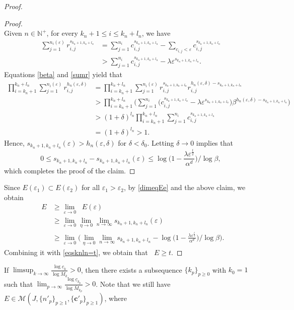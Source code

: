 \documentclass[12pt]{amsart}
\numberwithin{equation}{section}
\theoremstyle{plain}
\theoremstyle{remark}
\theoremstyle{definition}
\newcommand{\om}{\overline{M}}
\newcommand{\N}{\mathbb{N}}
\newcommand{\ccc}{\mathbf{c}}
\newcommand{\eps}{\varepsilon}
\newcommand{\de}{\delta}
\newcommand{\f}{\frac}
\newcommand{\uc}{\underline{c}}
\newcommand{\lam}{\lambda}
\renewcommand{\ge}{\geqslant}
\renewcommand{\le}{\leqslant}
\DeclareMathOperator{\dimqa}{dim_{qA}}
\begin{document}
\begin{proof}
\begin{proof}
\begin{equation}
			\end{equation}
			Given  $n\in \N^+$,  for every $ k_n+1\le i\le k_n+l_n$, we have
			\begin{equation}\label{sumr}
				\begin{aligned}
					\sum_{j=1}^{n_i(\eps)}r_{i,j}^{s_{k_n+1,k_n+l_n}}&=\sum_{j=1}^{n_i}c_{i,j}^{s_{k_n+1,k_n+l_n}}-\sum_{c_{i,j}<\eps}c_{i,j}^{s_{k_n+1,k_n+l_n}}\\
					&>\sum_{j=1}^{n_i}c_{i,j}^{s_{k_n+1,k_n+l_n}}-\lambda \eps^{s_{k_n+1,k_n+l_n}}.
				\end{aligned}
			\end{equation}
			Equations \eqref{beta} and \eqref{sumr} yield that
			\begin{align*}
				\prod_{i=k_n+1}^{k_n+l_n}\sum_{j=1}^{n_i(\eps)}r_{i,j}^{h_n(\eps,\de)}&=\prod_{i=k_n+1}^{k_n+l_n}\sum_{j=1}^{n_i(\eps)}r_{i,j}^{s_{k_n+1,k_n+l_n}}r_{i,j}^{h_n(\eps,\de)-s_{k_n+1,k_n+l_n}}\\
				&>\prod_{i=k_n+1}^{k_n+l_n}\Big(\sum_{j=1}^{n_i}\Big(c_{i,j}^{s_{k_n+1,k_n+l_n}}-\lambda \eps^{s_{k_n+1,k_n+l_n}}\Big)\beta^{h_n(\eps,\de)-s_{k_n+1,k_n+l_n}}\Big)\\
				&>(1+\de)^{l_n}\prod_{i=k_n+1}^{k_n+l_n}\sum_{j=1}^{n_i}c_{i,j}^{s_{k_n+1,k_n+l_n}}\\
				&=(1+\de)^{l_n} >1.
			\end{align*}
			Hence, $s_{k_n+1,k_n+l_n}(\eps)>h_n(\eps,\de)$ for $\de<\de_0$. 
			Letting $\de\to0$ implies that
			\[
			0\le s_{k_n+1,k_n+l_n}-s_{k_n+1,k_n+l_n}(\eps)\le{\log\Big(1-\frac{\lam \eps^{\frac{t}2}}{\alpha^d}\Big)}\Big/{\log \beta},
			\]
			which completes the proof of the claim.
		\end{proof}
		
		Since $E(\eps_1)\subset E(\eps_2)$ for all $\eps_1>\eps_2$,  by \eqref{dimeqEe} and  the above claim, we  obtain
		\begin{align*}
			\dimqa E &\ge \lim_{\eps\to 0}\dimqa E(\eps) \\
			&\ge\lim_{\eps\to 0} \lim_{\eta\to 0}\lim_{n\to\infty}s_{k_n+1,k_n+l_n}(\eps)\\
			&\ge \lim_{\eps\to 0}\Big(\lim_{\eta\to 0}\lim_{n\to\infty}s_{k_n+1,k_n+l_n}-{\log\Big(1-\frac{\lam \eps^{\frac{t}2}}{\alpha^d}\Big)}\Big/{\log \beta}\Big).
		\end{align*}
		Combining it with \eqref{eqsknln=t}, we obtain that $  \dimqa E \ge t$. 
	\end{proof}
	\fi
	\iffalse
	If $ \limsup_{k\to\infty}\frac{\log \uc_k}{\log \om_{k}}>0$, then there exists a subsequence $\{k_p\}_{p\ge 0}$ with $k_0=1$ such that $\lim_{p\to\infty}\f{\log \uc_{k_p}}{\log \om_{k_p}}>0$. Note that we still have $E\in\mathcal{M}(J,\{n'_p\}_{p\ge 1},\{\ccc'_p\}_{p\ge 1})$, where
\end{document}
